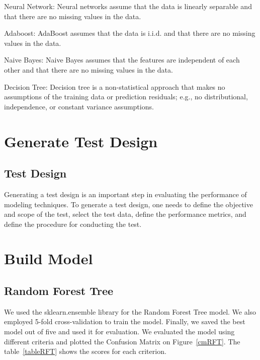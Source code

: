 Neural Network: Neural networks assume that the data is linearly separable and that there are no missing values in the data.

Adaboost: AdaBoost assumes that the data is i.i.d. and that there are no missing values in the data.

Naive Bayes: Naive Bayes assumes that the features are independent of each other and that there are no missing values in the data.

Decision Tree: Decision tree is a non-statistical approach that makes no assumptions of the training data or prediction residuals; e.g., no distributional, independence, or constant variance assumptions.


\section{Generate Test Design}

\subsection{Test Design}
Generating a test design is an important step in evaluating the performance of modeling techniques. To generate a test design, one needs to define the objective and scope of the test, select the test data, define the performance metrics, and define the procedure for conducting the test.

\section{Build Model}  

\subsection{Random Forest Tree}



We used the sklearn.ensemble library for the Random Forest Tree model. We also employed 5-fold cross-validation to train the model. Finally, we saved the best model out of five and used it for evaluation.
We evaluated the model using different criteria and plotted the Confusion Matrix on Figure~\ref{cmRFT}. The table~\ref{tableRFT} shows the scores for each criterion.
  


